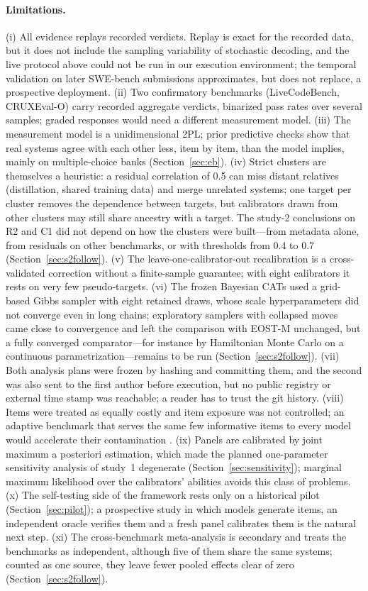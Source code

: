 \paragraph{Limitations.} (i) All evidence replays recorded verdicts. Replay is exact for
the recorded data, but it does not include the sampling variability of stochastic
decoding, and the live protocol above could not be run in our
execution environment; the temporal validation on later SWE-bench submissions
approximates, but does not replace, a prospective deployment. (ii) Two confirmatory
benchmarks (LiveCodeBench, CRUXEval-O) carry recorded aggregate verdicts, binarized pass
rates over several samples; graded responses would need a different measurement model.
(iii) The measurement model is a unidimensional 2PL; prior predictive checks show that
real systems agree with each other less, item by item, than the model implies, mainly on
multiple-choice banks (Section~\ref{sec:eb}). (iv) Strict clusters are themselves a
heuristic: a residual correlation of 0.5 can miss distant relatives (distillation,
shared training data) and merge unrelated systems; one target per cluster removes the
dependence between targets, but calibrators drawn from other clusters may still share
ancestry with a target. The study-2 conclusions on R2 and C1 did not depend on how the
clusters were built---from metadata alone, from residuals on other benchmarks, or with
thresholds from 0.4 to 0.7 (Section~\ref{sec:s2follow}). (v) The leave-one-calibrator-out recalibration is a
cross-validated correction without a finite-sample guarantee; with eight calibrators it
rests on very few pseudo-targets. (vi) The frozen Bayesian CATs used a grid-based Gibbs
sampler with eight retained draws, whose scale hyperparameters did not converge even in long
chains; exploratory samplers with collapsed moves came close to convergence and left the
comparison with EOST-M unchanged, but a fully converged comparator---for instance by
Hamiltonian Monte Carlo on a continuous parametrization---remains to be run
(Section~\ref{sec:s2follow}). (vii) Both analysis plans were frozen by
hashing and committing them, and the second was also sent to the first author before
execution, but no public registry or external time stamp was reachable; a reader has to
trust the git history. (viii) Items were treated as equally costly and item exposure was
not controlled; an adaptive benchmark that serves the same few informative items to every
model would accelerate their contamination \citep{wainer2000cat}. (ix) Panels are
calibrated by joint maximum a posteriori estimation, which made the planned
one-parameter sensitivity analysis of study~1 degenerate (Section~\ref{sec:sensitivity});
marginal maximum likelihood over the calibrators' abilities avoids this class of
problems. (x) The self-testing side of the framework rests only on a historical pilot
(Section~\ref{sec:pilot}); a prospective study in which models generate items, an
independent oracle verifies them and a fresh panel calibrates them is the natural next
step. (xi) The cross-benchmark meta-analysis is secondary and treats the benchmarks as
independent, although five of them share the same systems; counted as one source, they leave
fewer pooled effects clear of zero (Section~\ref{sec:s2follow}).


